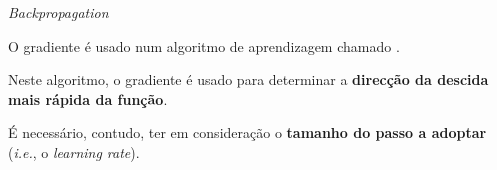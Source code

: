 \begin{frame}{\textit{Backpropagation} \cont}
    
    O gradiente é usado num algoritmo de aprendizagem chamado .
    
    \pauseskip
    
    Neste algoritmo, o gradiente é usado para determinar a \textbf{direcção da descida mais rápida da função}.
    
    \pauseskip
    
    É necessário, contudo, ter em consideração o \textbf{tamanho do passo a adoptar} (\textit{i.e.}, o \textit{learning rate}).
    
    \medskip
    

\end{frame}
